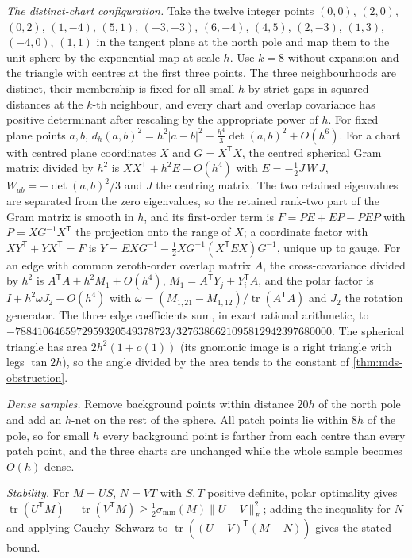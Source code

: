 \emph{The distinct-chart configuration.}
Take the twelve integer points
$(0,0)$, $(2,0)$, $(0,2)$, $(1,-4)$, $(5,1)$, $(-3,-3)$, $(6,-4)$, $(4,5)$, $(2,-3)$, $(1,3)$, $(-4,0)$, $(1,1)$
in the tangent plane at the north pole and map them to the unit sphere by the exponential map at scale $h$.
Use $k=8$ without expansion and the triangle with centres at the first three points.
The three neighbourhoods are distinct, their membership is fixed for all small $h$ by strict gaps in squared distances at the $k$-th neighbour, and every chart and overlap covariance has positive determinant after rescaling by the appropriate power of $h$.
For fixed plane points $a,b$, $d_h(a,b)^2=h^2|a-b|^2-\tfrac{h^4}{3}\det(a,b)^2+O(h^6)$.
For a chart with centred plane coordinates $X$ and $G=X^{\mathsf T}X$, the centred spherical Gram matrix divided by $h^2$ is $XX^{\mathsf T}+h^2E+O(h^4)$ with $E=-\tfrac12J\,W\,J$, $W_{ab}=-\det(a,b)^2/3$ and $J$ the centring matrix.
The two retained eigenvalues are separated from the zero eigenvalues, so the retained rank-two part of the Gram matrix is smooth in $h$, and its first-order term is $F=PE+EP-PEP$ with $P=XG^{-1}X^{\mathsf T}$ the projection onto the range of $X$; a coordinate factor with $XY^{\mathsf T}+YX^{\mathsf T}=F$ is $Y=EXG^{-1}-\tfrac12XG^{-1}(X^{\mathsf T}EX)G^{-1}$, unique up to gauge.
For an edge with common zeroth-order overlap matrix $A$, the cross-covariance divided by $h^2$ is $A^{\mathsf T}A+h^2M_1+O(h^4)$, $M_1=A^{\mathsf T}Y_j+Y_i^{\mathsf T}A$, and the polar factor is $I+h^2\omega J_2+O(h^4)$ with $\omega=(M_{1,21}-M_{1,12})/\operatorname{tr}(A^{\mathsf T}A)$ and $J_2$ the rotation generator.
The three edge coefficients sum, in exact rational arithmetic, to $-7884106465972959320549378723/3276386621095812942397680000$.
The spherical triangle has area $2h^2(1+o(1))$ (its gnomonic image is a right triangle with legs $\tan 2h$), so the angle divided by the area tends to the constant of \cref{thm:mds-obstruction}.

\emph{Dense samples.}
Remove background points within distance $20h$ of the north pole and add an $h$-net on the rest of the sphere.
All patch points lie within $8h$ of the pole, so for small $h$ every background point is farther from each centre than every patch point, and the three charts are unchanged while the whole sample becomes $O(h)$-dense.

\emph{Stability.}
For $M=US$, $N=VT$ with $S,T$ positive definite, polar optimality gives $\operatorname{tr}(U^{\mathsf T}M)-\operatorname{tr}(V^{\mathsf T}M)\ge\tfrac12\sigma_{\min}(M)\|U-V\|_F^2$; adding the inequality for $N$ and applying Cauchy--Schwarz to $\operatorname{tr}((U-V)^{\mathsf T}(M-N))$ gives the stated bound.

